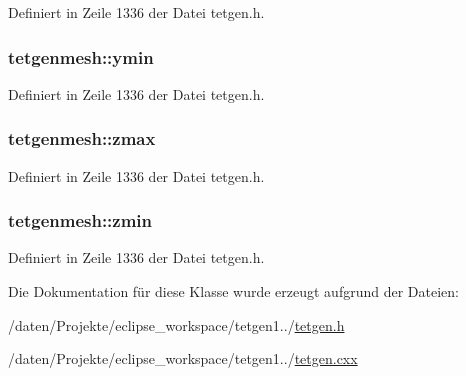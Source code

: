 Definiert in Zeile 1336 der Datei tetgen.\-h.

\hypertarget{classtetgenmesh_aeba2682688b3f46e3196b7f31007d49d}{
\subsubsection[{ymin}]{ tetgenmesh\-::ymin}}\label{classtetgenmesh_aeba2682688b3f46e3196b7f31007d49d}


Definiert in Zeile 1336 der Datei tetgen.\-h.

\hypertarget{classtetgenmesh_ac3ea8ccd4d30c7e2d4044d4f88628dda}{
\subsubsection[{zmax}]{ tetgenmesh\-::zmax}}\label{classtetgenmesh_ac3ea8ccd4d30c7e2d4044d4f88628dda}


Definiert in Zeile 1336 der Datei tetgen.\-h.

\hypertarget{classtetgenmesh_ad61db1a7fc133880cc65458ab77597eb}{
\subsubsection[{zmin}]{ tetgenmesh\-::zmin}}\label{classtetgenmesh_ad61db1a7fc133880cc65458ab77597eb}


Definiert in Zeile 1336 der Datei tetgen.\-h.



Die Dokumentation für diese Klasse wurde erzeugt aufgrund der Dateien\-:\begin{DoxyCompactItemize}
\item 
/daten/\-Projekte/eclipse\-\_\-workspace/tetgen1../\hyperlink{tetgen_8h}{tetgen.\-h}\item 
/daten/\-Projekte/eclipse\-\_\-workspace/tetgen1../\hyperlink{tetgen_8cxx}{tetgen.\-cxx}\end{DoxyCompactItemize}
